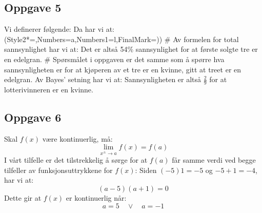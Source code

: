 \newpage
\subsection*{Oppgave 5}
\begin{easylist}[enumerate]
Vi definerer følgende:
Da har vi at: 
	\ListProperties(Style2*=,Numbers=a,Numbers1=l,FinalMark={)})
	# 
Av formelen for total sannsynlighet har vi at:
Det er altså 54\% sannsynlighet for at første solgte tre er en edelgran.
	# Spørsmålet i oppgaven er det samme som å spørre hva sannsynligheten er for at kjøperen av et tre er en kvinne, gitt at treet er en edelgran. Av Bayes' setning har vi at:
Sannsynligheten er altså $ \frac{2}{9} $ for at lotterivinneren er en kvinne.
\end{easylist}


\subsection*{Oppgave 6}
Skal $ f(x) $ være kontinuerlig, må:
\[ \lim\limits_{x^\pm\to a} f(x) =f(a)\]
I vårt tilfelle er det tilstrekkelig å sørge for at $ f(a) $ får samme verdi ved begge tilfeller av funksjonsuttrykkene for $ f(x) $:
Siden $ (-5)1=-5 $ og $-5+1=-4 $, har vi at:
\[ (a-5)(a+1)=0 \]
Dette gir at $ f(x) $ er kontinuerlig når:
\[ a = 5 \quad\vee\quad a=-1 \]
